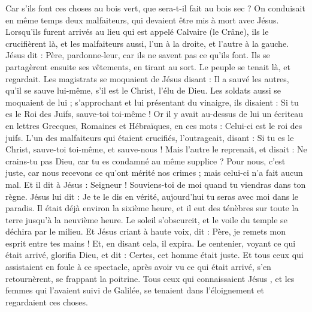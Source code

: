 \begin{multicols}{2}
Car s'ils font ces choses au bois vert, que sera-t-il fait au bois sec ?
On conduisait en même temps deux malfaiteurs, qui devaient être mis à mort avec Jésus.
Lorsqu’ils furent arrivés au lieu qui est appelé Calvaire (le Crâne), ils le crucifièrent là, et les malfaiteurs aussi, l'un à la droite, et l'autre à la gauche.
Jésus dit : Père, pardonne-leur, car ils ne savent pas ce qu'ils font. Ils se partagèrent ensuite ses vêtements, en tirant au sort.
Le peuple se tenait là, et regardait. Les magistrats se moquaient de Jésus disant : Il a sauvé les autres, qu'il se sauve lui-même, s'il est le Christ, l'élu de Dieu.
Les soldats aussi se moquaient de lui ; s'approchant et lui présentant du vinaigre,
ils disaient : Si tu es le Roi des Juifs, sauve-toi toi-même !
Or il y avait au-dessus de lui un écriteau en lettres Grecques, Romaines et Hébraïques, en ces mots : Celui-ci est le roi des juifs.
L’un des malfaiteurs qui étaient crucifiés, l'outrageait, disant : Si tu es le Christ, sauve-toi toi-même, et sauve-nous !
Mais l'autre le reprenait, et disait : Ne crains-tu pas Dieu, car tu es condamné au même supplice ?
Pour nous, c’est juste, car nous recevons ce qu’ont mérité nos crimes ; mais celui-ci n’a fait aucun mal.
Et il dit à Jésus : Seigneur ! Souviens-toi de moi quand tu viendras dans ton règne.
Jésus lui dit : Je te le dis en vérité, aujourd'hui tu seras avec moi dans le paradis.
Il était déjà environ la sixième heure, et il eut des ténèbres sur toute la terre jusqu'à la neuvième heure.
Le soleil s’obscurcit, et le voile du temple se déchira par le milieu.
Et Jésus criant à haute voix, dit : Père, je remets mon esprit entre tes mains ! Et, en disant cela, il expira.
Le centenier, voyant ce qui était arrivé, glorifia Dieu, et dit : Certes, cet homme était juste.
Et tous ceux qui assistaient en foule à ce spectacle, après avoir vu ce qui était arrivé, s'en retournèrent, se frappant la poitrine.
Tous ceux qui connaissaient Jésus , et les femmes qui l'avaient suivi de Galilée, se tenaient dans l’éloignement et regardaient ces choses.

\end{multicols}
